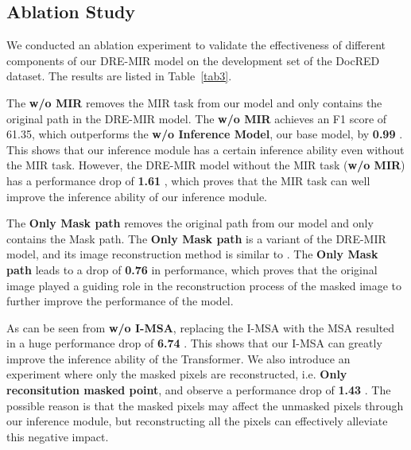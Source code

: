 \documentclass{article}
\begin{document}
\begin{table*}[th]
\begin{table}[]
\centering
{}
\caption{Performance of DRE-MIR with different numbers of layers in the inference module on the development set of DocRED.}
\label{tab4}
\end{table}



\subsection{Ablation Study}
We conducted an ablation experiment to validate the effectiveness of different components of our DRE-MIR model on the development set of the DocRED dataset.
The results are listed in Table~\ref{tab3}.

The \textbf{w/o MIR} removes the MIR task from our model and only contains the original path in the DRE-MIR model.
The \textbf{w/o MIR} achieves an F1 score of 61.35, which outperforms the \textbf{w/o Inference Model}, our base model, by \textbf{0.99} .
This shows that our inference module has a certain inference ability even without the MIR task.
However, the DRE-MIR model without the MIR task (\textbf{w/o MIR}) has a performance drop of \textbf{1.61} , which proves that the MIR task can well improve the inference ability of our inference module.

The \textbf{Only Mask path} removes the original path from our model and only contains the Mask path.
The \textbf{Only Mask path} is a variant of the DRE-MIR model, and its image reconstruction method is similar to \cite{c:23}.
The \textbf{Only Mask path} leads to a drop of \textbf{0.76}  in performance, which proves that the original image played a guiding role in the reconstruction process of the masked image to further improve the performance of the model.

As can be seen from \textbf{w/o I-MSA}, replacing the I-MSA with the MSA resulted in a huge performance drop of \textbf{6.74} .
This shows that our I-MSA can greatly improve the inference ability of the Transformer.
We also introduce an experiment where only the masked pixels are reconstructed, i.e. \textbf{Only reconsitution masked point}, and observe a performance drop of \textbf{1.43} .
The possible reason is that the masked pixels may affect the unmasked pixels through our inference module, but reconstructing all the pixels can effectively alleviate this negative impact.


\end{table*}
\end{document}
